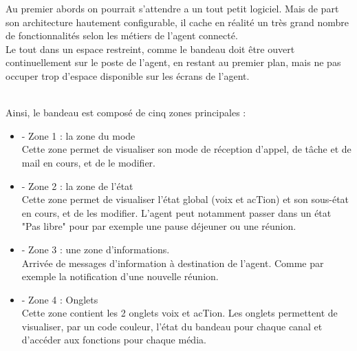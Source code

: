 \documentclass{rapport}
\begin{document}
\begin{minipage}{0.65\textwidth}
Au premier abords on pourrait s'attendre a un tout petit logiciel. Mais de part son architecture hautement configurable, il cache en réalité un très grand nombre de fonctionnalités selon les métiers de l'agent connecté.\\

Le tout dans un espace restreint, comme le bandeau doit être ouvert continuellement sur le poste de l'agent, en restant au premier plan, mais ne pas occuper trop d'espace disponible sur les écrans de l'agent. 
\end{minipage}
\begin{minipage}{0.25\textwidth}
\raggedright
\end{minipage}
\vspace{10mm} %
\noindent
\\

Ainsi, le bandeau est composé de cinq zones principales :

\vspace{5mm} %
\begin{minipage}{0.25\textwidth}
\end{minipage}
\begin{minipage}{0.65\textwidth}

\begin{itemize}
\item -	Zone 1 : la zone du mode \\
Cette zone permet de visualiser son mode de réception d’appel, de tâche et de mail en cours, et de le modifier.\\

\item -	Zone 2 : la zone de l’état\\
Cette zone permet de visualiser l’état global (voix et acTion) et son sous-état en cours, et de les modifier. L'agent peut notamment passer dans un état "Pas libre" pour par exemple une pause déjeuner ou une réunion.\\

\item -	Zone 3 : une zone d’informations.\\
Arrivée de messages d'information à destination de l'agent. Comme par exemple la notification d'une nouvelle réunion. \\

\item -	Zone 4 : Onglets\\
Cette zone contient les 2 onglets voix et acTion. 
Les onglets permettent de visualiser, par un code couleur, l’état du bandeau pour chaque canal et d’accéder aux fonctions pour chaque média.
\end{itemize}

\end{minipage}
\vspace{10mm} %
\noindent
\\
\end{document}
